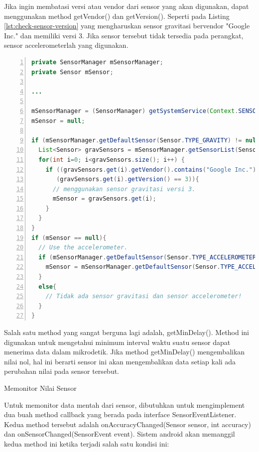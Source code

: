 \documentclass[a4paper,twoside]{article}
\begin{document}
\begin{enumerate}
Jika ingin membatasi versi atau vendor dari sensor yang akan digunakan, dapat menggunakan method getVendor() dan getVersion(). Seperti pada Listing \ref{lst:check-sensor-version} yang mengharuskan sensor gravitasi bervendor "Google Inc." dan memiliki versi 3. Jika sensor tersebut tidak tersedia pada perangkat, sensor accelerometerlah yang digunakan.

\begin{lstlisting}[language=java,numbers=left,breaklines=true,caption={Contoh untuk mengecek apakah perangkat yang digunakan memiliki sensor dengan jenis yang diberikan},label={lst:check-sensor-version},language=java]
private SensorManager mSensorManager;
private Sensor mSensor;

...

mSensorManager = (SensorManager) getSystemService(Context.SENSOR_SERVICE);
mSensor = null;

if (mSensorManager.getDefaultSensor(Sensor.TYPE_GRAVITY) != null){
  List<Sensor> gravSensors = mSensorManager.getSensorList(Sensor.TYPE_GRAVITY);
  for(int i=0; i<gravSensors.size(); i++) {
    if ((gravSensors.get(i).getVendor().contains("Google Inc.")) &&
       (gravSensors.get(i).getVersion() == 3)){
      // menggunakan sensor gravitasi versi 3.
      mSensor = gravSensors.get(i);
    }
  }
}
if (mSensor == null){
  // Use the accelerometer.
  if (mSensorManager.getDefaultSensor(Sensor.TYPE_ACCELEROMETER) != null){
    mSensor = mSensorManager.getDefaultSensor(Sensor.TYPE_ACCELEROMETER);
  }
  else{
    // Tidak ada sensor gravitasi dan sensor accelerometer!
  }
}
\end{lstlisting}

Salah satu method yang sangat berguna lagi adalah, getMinDelay(). Method ini digunakan untuk mengetahui minimum interval waktu suatu sensor dapat menerima data dalam mikrodetik. Jika method getMinDelay() mengembalikan nilai nol, hal ini berarti sensor ini akan mengembalikan data setiap kali ada perubahan nilai pada sensor tersebut. 

Memonitor Nilai Sensor\\

\label{sssec:memonitor_nilai_sensor}

Untuk memonitor data mentah dari sensor, dibutuhkan untuk mengimplement dua buah method callback yang berada pada interface SensorEventListener. Kedua method tersebut adalah onAccuracyChanged(Sensor sensor, int accuracy) dan onSensorChanged(SensorEvent event). Sistem android akan memanggil kedua method ini ketika terjadi salah satu kondisi ini:


\end{enumerate}
\end{document}
